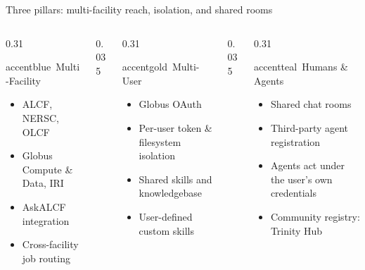 \documentclass[aspectratio=169,11pt]{beamer}
\begin{document}
\begin{frame}{Three pillars: multi-facility reach, isolation, and shared rooms}
  \begin{columns}[t, totalwidth=\textwidth]
    \begin{column}{0.31\textwidth}
      \begin{featbox}{accentblue}{\faServer\ Multi-Facility}
        \small
        \begin{itemize}\itemsep2pt
          \item ALCF, NERSC, OLCF
          \item Globus Compute \& Data, IRI
          \item AskALCF integration
          \item Cross-facility job routing
        \end{itemize}
      \end{featbox}
    \end{column}
    \begin{column}{0.035\textwidth}\end{column}
    \begin{column}{0.31\textwidth}
      \begin{featbox}{accentgold}{\faUserFriends\ Multi-User}
        \small
        \begin{itemize}\itemsep2pt
          \item Globus OAuth
          \item Per-user token \& filesystem isolation
          \item Shared skills and knowledgebase
          \item User-defined custom skills
        \end{itemize}
      \end{featbox}
    \end{column}
    \begin{column}{0.035\textwidth}\end{column}
    \begin{column}{0.31\textwidth}
      \begin{featbox}{accentteal}{{\tiny\faUser\!\faHandshake\!\faRobot}\ Humans \& Agents}
        \small
        \begin{itemize}\itemsep2pt
          \item Shared chat rooms
          \item Third-party agent registration
          \item Agents act under the user's own credentials
          \item Community registry: Trinity Hub
        \end{itemize}
      \end{featbox}
    \end{column}
  \end{columns}
\end{frame}
\end{document}
